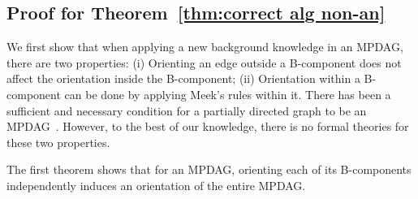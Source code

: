 \documentclass{article}
\begin{document}
\subsection{Proof for Theorem~\ref{thm:correct alg non-an}}
We first show that when applying a new background knowledge in an MPDAG, there are two properties: (i) Orienting an edge outside a B-component does not affect the orientation inside the B-component; (ii) Orientation within a B-component can be done by applying Meek's rules within it. There has been a sufficient and necessary condition for a partially directed graph to be an MPDAG~\citep{fang2022representation}. However, to the best of our knowledge, there is no formal theories for these two properties.

The first theorem shows that for an MPDAG, orienting each of its B-components independently induces an orientation of the entire MPDAG.
\end{document}
